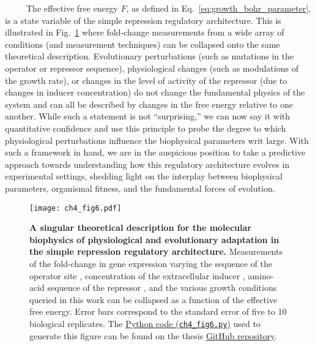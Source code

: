 \documentclass[12pt]{caltech_thesis}
\begin{document}
~~~~~The effective free energy \(F\), as defined in
Eq.~\ref{eq:growth_bohr_parameter}, is a state variable of the simple
repression regulatory architecture. This is illustrated in
Fig.~\ref{fig:collapse} where fold-change measurements from a wide array
of conditions (and measurement techniques) can be collapsed onto the
same theoretical description. Evolutionary perturbations (such as
mutations in the operator or repressor sequence), physiological changes
(such as modulations of the growth rate), or changes in the level of
activity of the repressor (due to changes in inducer concentration) do
not change the fundamental physics of the system and can all be
described by changes in the free energy relative to one another. While
such a statement is not ``surprising,'' we can now say it with
quantitative confidence and use this principle to probe the degree to
which physiological perturbations influence the biophysical parameters
writ large. With such a framework in hand, we are in the auspicious
position to take a predictive approach towards understanding how this
regulatory architecture evolves in experimental settings, shedding light
on the interplay between biophysical parameters, organismal fitness, and
the fundamental forces of evolution.

\hypertarget{fig:collapse}{%
\begin{figure}
\centering
\texttt{[image: ch4\_fig6.pdf]}
\caption[{A singular theoretical description for the molecular
biophysics of physiological and evolutionary adaptation in the simple
repression motif.}]{\textbf{A singular theoretical description for the
molecular biophysics of physiological and evolutionary adaptation in the
simple repression regulatory architecture.} Measurements of the
fold-change in gene expression varying the sequence of the operator site
\autocite[orange pentagon,][]{garcia2011}, concentration of the
extracellular inducer \autocite[green squares,][ and Chapter
2]{razo-mejia2018}, amino-acid sequence of the repressor \autocite[blue
points,][ and Chapter 3]{chure2019}, and the various growth conditions
queried in this work can be collapsed as a function of the effective
free energy. Error bars correspond to the standard error of five to 10
biological replicates. The
\href{https://github.com/gchure/phd/blob/master/src/chapter_04/code/ch4_fig6.py}{Python
code (\texttt{ch4\_fig6.py})} used to generate this figure can be found
on the thesis \href{https://github.com/gchure/phd}{GitHub repository}.}
\label{fig:collapse}
\end{figure}
}
\end{document}
